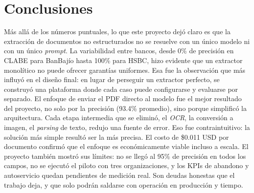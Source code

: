 \begin{table}[H]
\centering
{}
\caption{Estado de los KPIs al cierre del proyecto}
\label{tab:cumplimiento_kpis}
\end{table}

\section{Conclusiones}

Más allá de los números puntuales, lo que este proyecto dejó claro es que la extracción de documentos no estructurados no se resuelve con un único modelo ni con un único \textit{prompt}. La variabilidad entre bancos, desde 0\% de precisión en CLABE para BanBajío hasta 100\% para HSBC, hizo evidente que un extractor monolítico no puede ofrecer garantías uniformes. Esa fue la observación que más influyó en el diseño final: en lugar de perseguir un extractor perfecto, se construyó una plataforma donde cada caso puede configurarse y evaluarse por separado. El enfoque de enviar el PDF directo al modelo fue el mejor resultado del proyecto, no solo por la precisión (93.4\% promedio), sino porque simplificó la arquitectura. Cada etapa intermedia que se eliminó, el \textit{OCR}, la conversión a imagen, el \textit{parsing} de texto, redujo una fuente de error. Eso fue contraintuitivo: la solución más simple resultó ser la más precisa. El costo de \$0.011 USD por documento confirmó que el enfoque es económicamente viable incluso a escala. El proyecto también mostró sus límites: no se llegó al 95\% de precisión en todos los campos, no se ejecutó el piloto con tres organizaciones, y los KPIs de abandono y autoservicio quedan pendientes de medición real. Son deudas honestas que el trabajo deja, y que solo podrán saldarse con operación en producción y tiempo.

